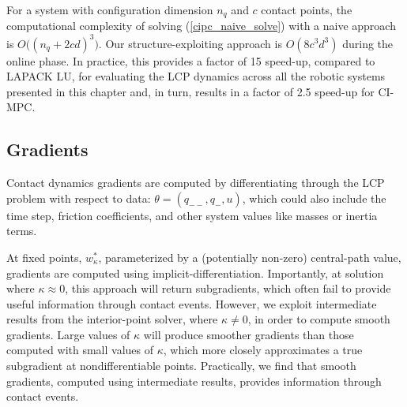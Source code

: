 For a system with configuration dimension $n_q$ and $c$ contact points, the computational complexity of solving (\ref{cipc_naive_solve}) with a naive approach is $O\Big((n_q+2cd)^3 \Big)$. Our structure-exploiting approach is $O(8c^3d^3)$ during the online phase. In practice, this provides a factor of 15 speed-up, compared to LAPACK LU, for evaluating the LCP dynamics across all the robotic systems presented in this chapter and, in turn, results in a factor of 2.5 speed-up for CI-MPC.

\subsection{Gradients}
Contact dynamics gradients are computed by differentiating through the LCP problem with respect to data: $\theta = (q_{--}, q_{-}, u)$, which could also include the time step, friction coefficients, and other system values like masses or inertia terms. 

At fixed points, $w^*_{\kappa}$, parameterized by a (potentially non-zero) central-path value, gradients are computed using implicit-differentiation. Importantly, at solution where $\kappa \approx 0$, this approach will return subgradients, which often fail to provide useful information through contact events. However, we exploit intermediate results from the interior-point solver, where $\kappa \neq 0$, in order to compute smooth gradients. Large values of $\kappa$ will produce smoother gradients than those computed with small values of $\kappa$, which more closely approximates a true subgradient at nondifferentiable points. Practically, we find that smooth gradients, computed using intermediate results, provides information through contact events.

